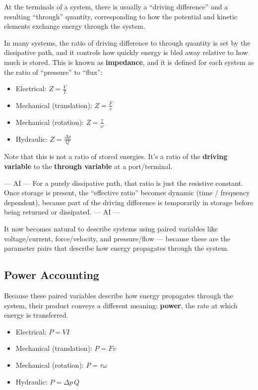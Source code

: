 \documentclass[
  letterpaper,
  DIV=11,
  numbers=noendperiod]{scrartcl}
\providecommand{\tightlist}{%
  \setlength{\itemsep}{0pt}\setlength{\parskip}{0pt}}
\begin{document}
At the terminals of a system, there is usually a ``driving difference''
and a resulting ``through'' quantity, corresponding to how the potential
and kinetic elements exchange energy through the system.

In many systems, the ratio of driving difference to through quantity is
set by the dissipative path, and it controls how quickly energy is bled
away relative to how much is stored. This is known as
\textbf{impedance}, and it is defined for each system as the ratio of
``pressure'' to ``flux'':

\begin{itemize}
\tightlist
\item
  Electrical: \(Z = \frac{V}{I}\)
\item
  Mechanical (translation): \(Z = \frac{F}{v}\)
\item
  Mechanical (rotation): \(Z = \frac{\tau}{\omega}\)
\item
  Hydraulic: \(Z = \frac{\Delta p}{Q}\)
\end{itemize}

Note that this is not a ratio of stored energies. It's a ratio of the
\textbf{driving variable} to the \textbf{through variable} at a
port/terminal.

--- AI --- For a purely dissipative path, that ratio is just the
resistive constant. Once storage is present, the ``effective ratio''
becomes dynamic (time / frequency dependent), because part of the
driving difference is temporarily in storage before being returned or
dissipated. --- AI ---

It now becomes natural to describe systems using paired variables like
voltage/current, force/velocity, and pressure/flow --- because these are
the parameter pairs that describe how energy propagates through the
system.

\subsection{Power Accounting}\label{power-accounting}

Because these paired variables describe how energy propagates through
the system, their product conveys a different meaning: \textbf{power},
the rate at which energy is transferred.

\begin{itemize}
\tightlist
\item
  Electrical: \(P = VI\)\\
\item
  Mechanical (translation): \(P = Fv\)\\
\item
  Mechanical (rotation): \(P = \tau \omega\)\\
\item
  Hydraulic: \(P = \Delta p \, Q\)
\end{itemize}
\end{document}
